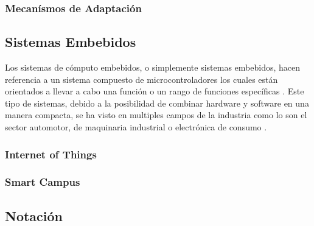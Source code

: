 \documentclass[12pt]{article}
\begin{document}

    \subsubsection{Mecanísmos de Adaptación}
    

    \subsection{Sistemas Embebidos}
    

    Los sistemas de cómputo embebidos, o simplemente sistemas embebidos, hacen referencia a un sistema compuesto de microcontroladores los cuales están orientados a llevar a cabo una función o un rango de funciones específicas \cite{heath2002embedded}. Este tipo de sistemas, debido a la posibilidad de combinar hardware y software en una manera compacta, se ha visto en multiples campos de la industria como lo son el sector automotor, de maquinaria industrial o electrónica de consumo \cite{deichmann_2022}.

    \subsubsection{Internet of Things}


    \subsubsection{Smart Campus}

    
    \subsection{Notación} %
\end{document}
